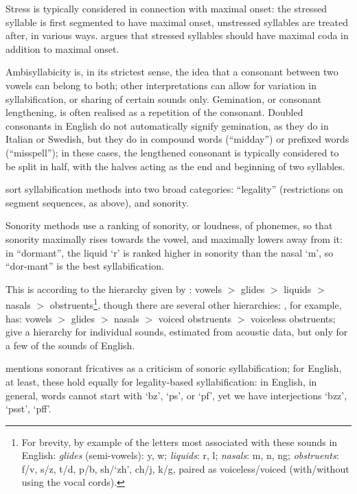 \documentclass{article}[11pt]
\begin{document}
Stress is typically considered in connection with maximal onset: the stressed syllable is first segmented to have maximal onset, unstressed syllables are treated after, in various ways. \citet{wells_syllabification_2019} argues 
that stressed syllables should have maximal coda in addition to maximal onset.

Ambisyllabicity is, in its strictest sense, the idea that a consonant between two vowels can belong to both; other interpretations can allow for variation in syllabification, or sharing of certain sounds only. Gemination, or consonant lengthening, is often realised as a repetition of the consonant. Doubled consonants in English do not automatically signify gemination, as they do in Italian or Swedish, but they do in compound words (``midday'') or prefixed words (``misspell''); in these cases, the lengthened consonant is typically considered to be split in half, with the halves acting as the end and beginning of two syllables.

\citet{goslin_comparing_2007} sort syllabification methods into two broad categories: ``legality'' (restrictions on segment sequences, as above), and sonority.

Sonority methods use a ranking of sonority, or loudness, of phonemes, so that sonority maximally rises towards the vowel, and maximally lowers away from it: in ``dormant'', the liquid `r' is ranked higher in sonority than the nasal `m', so ``dor-mant'' is the best syllabification.

This is according to the hierarchy given by \citet{kingston_role_1990}: vowels $>$ glides $>$ liquids $>$ nasals $>$ obstruents\footnote{For brevity, by example of the letters most associated with these sounds in English: \textit{glides} (semi-vowels): y, w; \textit{liquids}: r, l; \textit{nasals}: m, n, ng; \textit{obstruents}: f/v, s/z, t/d, p/b, sh/`zh', ch/j, k/g, paired as voiceless/voiced (with/without using the vocal cords).}, though there are several other hierarchies: \citet{katamba_introduction_1989}, for example, has: vowels $>$ glides $>$ nasals $>$ voiced obstruents $>$ voiceless obstruents; \citet{ladefoged_course_2011} give a hierarchy for individual sounds, estimated from acoustic data, but only for a few of the sounds of English.

\citet{saussure_course_1959} mentions sonorant fricatives as a criticism of sonoric syllabification; for English, at least, these hold equally for legality-based syllabification: in English, in general, words cannot start with `bz', `ps', or `pf', yet we have interjections `bzz', `psst', `pff'.
\end{document}
